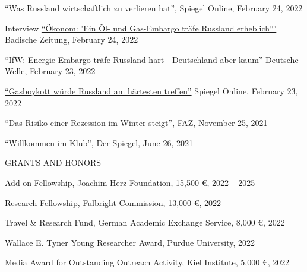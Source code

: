 \documentclass{article}
\begin{document}
\begin{minipage}[t]{0.8\textwidth}
    \href{https://www.spiegel.de/wirtschaft/russland-und-die-eu-was-russland-wirtschaftlich-zu-verlieren-hat-a-09eb6357-9607-45f8-bfb8-d39ef5e71b86}{``Was Russland wirtschaftlich zu verlieren hat''}, Spiegel Online, February 24, 2022 \par
    Interview \href{https://www.badische-zeitung.de/die-russland-sanktionen-sind-noch-nicht-die-ganz-grosse-keule--209731804.html}{``Ökonom: 'Ein Öl- und Gas-Embargo träfe Russland erheblich'''} Badische Zeitung, February 24, 2022 \par
    \href{https://www.dw.com/de/ifw-energie-embargo-tr\%C3\%A4fe-russland-hart-deutschland-aber-kaum/a-60885585}{``IfW: Energie-Embargo träfe Russland hart - Deutschland aber kaum''} Deutsche Welle, February 23, 2022 \par
    \href{https://www.spiegel.de/wirtschaft/unternehmen/sanktionen-wegen-ukraine-eskalation-gas-boykott-wuerde-russland-am-haertesten-treffen-a-d28dc387-1c8b-498d-9470-ef15043fac74}{``Gasboykott würde Russland am härtesten treffen''} Spiegel Online, February 23, 2022 \par
    ``Das Risiko einer Rezession im Winter steigt'', FAZ, November 25, 2021 \par
    ``Willkommen im Klub'', Der Spiegel, June 26, 2021 \par
\end{minipage}
\medskip


\begin{minipage}[t]{0.12\textwidth}
    {\selectfont GRANTS AND HONORS} \\
\end{minipage}
\hspace{5mm}
\begin{minipage}[t]{0.8\textwidth}
    Add-on Fellowship, Joachim Herz Foundation, 15,500 \euro{}, 2022 -- 2025 \par
    Research Fellowship, Fulbright Commission, 13,000 \euro{}, 2022 \par
    Travel \& Research Fund, German Academic Exchange Service, 8,000 \euro{}, 2022 \par
    Wallace E. Tyner Young Researcher Award, Purdue University, 2022 \par
    Media Award for Outstanding Outreach Activity, Kiel Institute, 5,000 \euro{}, 2022 \par
\end{minipage}
\medskip
\end{document}
